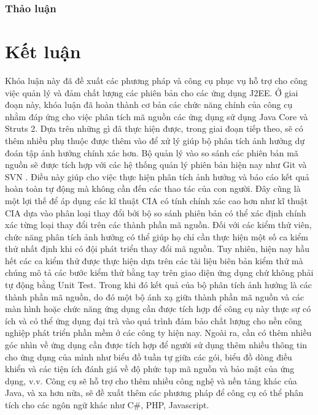 \documentclass[12pt]{report}
\begin{document}
\subsection{Thảo luận}

\chapter{Kết luận}
\label{chap:conclusion}
Khóa luận này đã đề xuất các phương pháp và công cụ phục vụ hỗ trợ cho công việc quản lý và đảm chất lượng các phiên bản cho các ứng dụng J2EE. Ở giai đoạn này, khóa luận đã hoàn thành cơ bản các chức năng chính của công cụ nhằm đáp ứng cho việc phân tích mã nguồn các ứng dụng sử dụng Java Core và Struts 2. Dựa trên những gì đã thực hiện được, trong giai đoạn tiếp theo, sẽ có thêm nhiều phụ thuộc được thêm vào để xử lý giúp bộ phân tích ảnh hưởng dự đoán tập ảnh hưởng chính xác hơn. Bộ quản lý vào so sánh các phiên bản mã nguồn sẽ được tích hợp với các hệ thống quản lý phiên bản hiện nay như Git và SVN . Điều này giúp cho việc thực hiện phân tích ảnh hưởng và báo cáo kết quả hoàn toàn tự động mà không cần đến các thao tác của con người. Đây cũng là một lợi thế để áp dụng các kĩ thuật CIA có tính chính xác cao hơn như kĩ thuật CIA dựa vào phân loại thay đổi bởi bộ so sánh phiên bản có thể xác định chính xác từng loại thay đổi trên các thành phần mã nguồn. Đối với các kiểm thử viên, chức năng phân tích ảnh hưởng có thể giúp họ chỉ cần thực hiện một số ca kiểm thử nhất định khi có đội phát triển thay đổi mã nguồn. Tuy nhiên, hiện nay hầu hết các ca kiểm thử được thực hiện dựa trên các tài liệu biên bản kiểm thử mà chúng mô tả các bước kiểm thử bằng tay trên giao diện ứng dụng chứ không phải tự động bằng Unit Test. Trong khi đó kết quả của bộ phân tích ảnh hưởng là các thành phần mã nguồn, do đó một bộ ánh xạ giữa thành phần mã nguồn và các màn hình hoặc chức năng ứng dụng cần được tích hợp để công cụ này thực sự có ích và có thể ứng dụng đại trà vào quá trình đảm bảo chất lượng cho nền công nghiệp phát triển phần mềm ở các công ty hiện nay. Ngoài ra, cần có thêm nhiều góc nhìn về ứng dụng cần được tích hợp để người sử dụng thêm nhiều thông tin cho ứng dụng của mình như biểu đồ tuần tự giữa các gói, biểu đồ dòng điều khiển và các tiện ích đánh giá về độ phức tạp mã nguồn và bảo mật của ứng dụng, v.v. Công cụ sẽ hỗ trợ cho thêm nhiều công nghệ và nền tảng khác của Java, và xa hơn nữa, sẽ đề xuất thêm các phương pháp để công cụ có thể phân tích cho các ngôn ngữ khác như C\#, PHP, Javascript.
\end{document}
